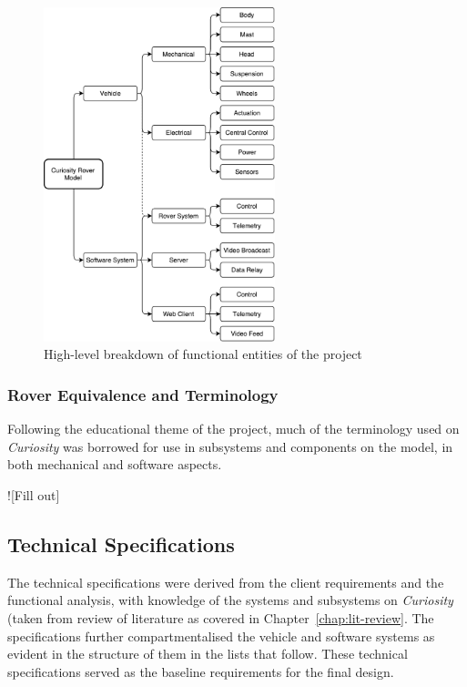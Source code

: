     \begin{figure}[h]
      \centering
      \includegraphics[width=0.6\textwidth]{figures/specs-functionalBreakdown}
      \caption[High-level breakdown of functional entities of the project]{High-level breakdown of functional entities of the project}
      \label{fig:specs-functionalBreakdown}
    \end{figure}
    
    \subsubsection{Rover Equivalence and Terminology}
    \label{subsubsec:rover-equivalence}
      Following the educational theme of the project, much of the terminology used on \textit{Curiosity} was borrowed for use in subsystems and components on the model, in both mechanical and software aspects.
      
      ![Fill out]
    
    
  \subsection{Technical Specifications}
    The technical specifications were derived from the client requirements and the functional analysis, with knowledge of the systems and subsystems on \textit{Curiosity} (taken from review of literature as covered in Chapter~\ref{chap:lit-review}. The specifications further compartmentalised the vehicle and software systems as evident in the structure of them in the lists that follow. These technical specifications served as the baseline requirements for the final design.
    
